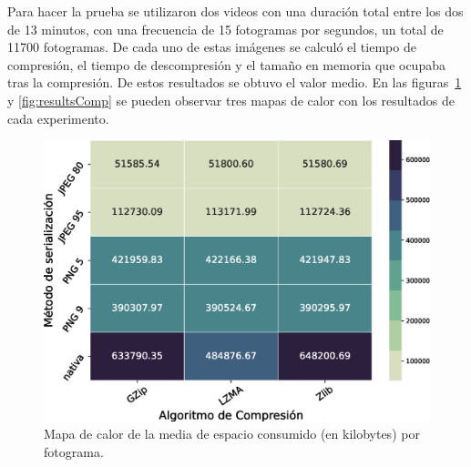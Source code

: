 Para hacer la prueba se utilizaron dos videos con una duración total entre los dos de 13 minutos, con una frecuencia de 15 fotogramas por segundos, un total de 11700 fotogramas. De cada uno de estas imágenes se calculó el tiempo de compresión, el tiempo de descompresión y el tamaño en memoria que ocupaba tras la compresión. De estos resultados se obtuvo el valor medio. En las figuras~\ref{fig:heatmapmemory} y \ref{fig:resultsComp} se pueden observar tres mapas de calor con los resultados de cada experimento.

\begin{figure}[h]
	\centering
	\includegraphics[width=\textwidth]{img/MemoriaMedia.eps}
	\caption{Mapa de calor de la media de espacio consumido (en kilobytes) por fotograma.}
	\label{fig:heatmapmemory}
\end{figure}


